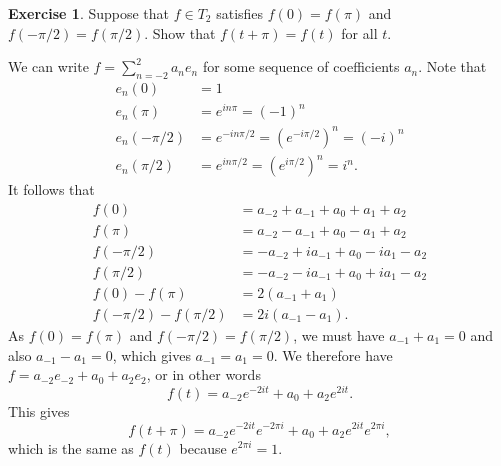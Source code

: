 \documentclass{amsart}
\renewcommand{\:}       {\colon}
\theoremstyle{definition}
\newtheorem{exercise}{Exercise}[section]
\renewenvironment{solution}{\SolutionAtEnd}{\endSolutionAtEnd}
\begin{document}
\begin{exercise}
 Suppose that $f\in T_2$ satisfies $f(0)=f(\pi)$ and
 $f(-\pi/2)=f(\pi/2)$.  Show that $f(t+\pi)=f(t)$ for all $t$.
\end{exercise}
\begin{solution}
 We can write $f=\sum_{n=-2}^2a_ne_n$ for some sequence of
 coefficients $a_n$.  Note that 
 \begin{align*}
  e_n(0) &= 1 \\
  e_n(\pi) &= e^{in\pi} = (-1)^n \\
  e_n(-\pi/2) &= e^{-in\pi/2} = (e^{-i\pi/2})^n = (-i)^n \\
  e_n(\pi/2) &= e^{in\pi/2} = (e^{i\pi/2})^n = i^n.
 \end{align*}
 It follows that 
 \begin{align*}
  f(0)      &= a_{-2} + a_{-1} + a_0 + a_1 + a_2 \\
  f(\pi)    &= a_{-2} - a_{-1} + a_0 - a_1 + a_2 \\
  f(-\pi/2) &= -a_{-2} + ia_{-1} + a_0 - ia_1 - a_2 \\
  f(\pi/2)  &= -a_{-2} - ia_{-1} + a_0 + ia_1 - a_2 \\
  f(0)-f(\pi) &= 2(a_{-1}+a_1) \\
  f(-\pi/2)-f(\pi/2) &= 2i(a_{-1}-a_1). 
 \end{align*}
 As $f(0)=f(\pi)$ and $f(-\pi/2)=f(\pi/2)$, we must have
 $a_{-1}+a_1=0$ and also $a_{-1}-a_1=0$, which gives $a_{-1}=a_1=0$.
 We therefore have $f=a_{-2}e_{-2}+a_0+a_2e_2$, or in other words
 \[ f(t) = a_{-2} e^{-2it} + a_0 + a_2 e^{2it}. \]
 This gives 
 \[ f(t+\pi) = 
  a_{-2} e^{-2it}e^{-2\pi i} + a_0 + a_2 e^{2it} e^{2\pi i},
 \]
 which is the same as $f(t)$ because $e^{2\pi i}=1$.
\end{solution}
\end{document}
